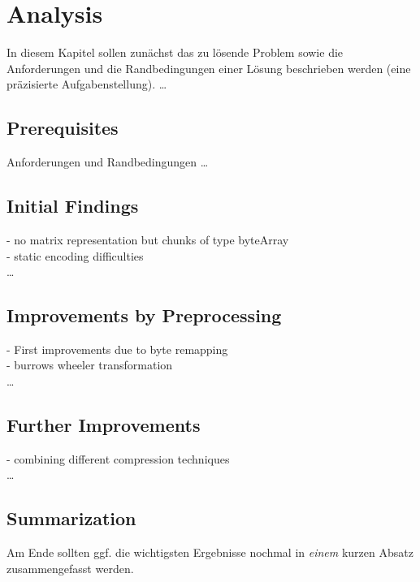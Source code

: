 
\chapter{Analysis}
\label{ch:Analysis}
In diesem Kapitel sollen zunächst das zu lösende Problem
sowie die Anforderungen und die Randbedingungen 
einer Lösung beschrieben werden (eine präzisierte Aufgabenstellung).
\ldots

\section{Prerequisites}
\label{ch:Analysis:sec:Prerequisites}
Anforderungen und Randbedingungen \ldots

\section{Initial Findings}
\label{ch:Analysis:sec:Initial Findings}
- no matrix representation but chunks of type byteArray\\
- static encoding difficulties\\
\ldots

\section{Improvements by Preprocessing}
\label{ch:Analysis:sec:Improvements by Preprocessing}
- First improvements due to byte remapping\\
- burrows wheeler transformation\\
\ldots

\section{Further Improvements}
\label{ch:Analysis:sec:Further Improvements}
- combining different compression techniques\\
\ldots


\section{Summarization}
\label{ch:Analyse:sec:Summarization}

Am Ende sollten ggf. die wichtigsten Ergebnisse nochmal in \emph{einem}
kurzen Absatz zusammengefasst werden.

